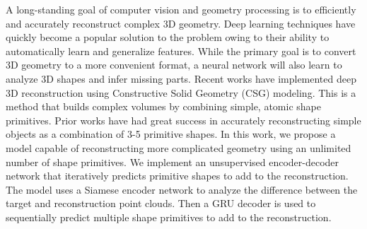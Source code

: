 A long-standing goal of computer vision and geometry processing is to efficiently and accurately reconstruct complex 3D geometry. Deep learning techniques have quickly become a popular solution to the problem owing to their ability to automatically learn and generalize features. While the primary goal is to convert 3D geometry to a more convenient format, a neural network will also learn to analyze 3D shapes and infer missing parts. Recent works have implemented deep 3D reconstruction using Constructive Solid Geometry (CSG) modeling. This is a method that builds complex volumes by combining simple, atomic shape primitives. Prior works have had great success in accurately reconstructing simple objects as a combination of 3-5 primitive shapes. In this work, we propose a model capable of reconstructing more complicated geometry using an unlimited number of shape primitives. We implement an unsupervised encoder-decoder network that iteratively predicts primitive shapes to add to the reconstruction. The model uses a Siamese encoder network to analyze the difference between the target and reconstruction point clouds. Then a GRU decoder is used to sequentially predict multiple shape primitives to add to the reconstruction.

\vspace{1em}

